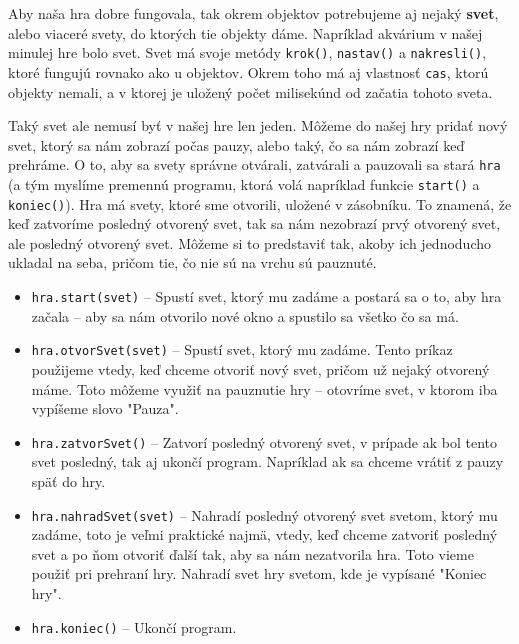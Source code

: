 





Aby naša hra dobre fungovala, tak okrem objektov potrebujeme aj nejaký \textbf{svet}, alebo viaceré
svety, do ktorých tie objekty dáme. Napríklad akvárium v našej minulej hre bolo svet. Svet má svoje
metódy \texttt{krok()}, \texttt{nastav()} a \texttt{nakresli()}, ktoré fungujú rovnako ako u
objektov. Okrem toho má aj vlastnosť \texttt{cas}, ktorú objekty nemali, a v ktorej je uložený počet
milisekúnd od začatia tohoto sveta.

Taký svet ale nemusí byť v našej hre len jeden. Môžeme do našej hry pridať nový svet, ktorý sa
nám zobrazí počas pauzy, alebo taký, čo sa nám zobrazí keď prehráme. O to, aby sa svety správne
otvárali, zatvárali a pauzovali sa stará \texttt{hra} (a tým myslíme premennú programu, ktorá volá
napríklad funkcie \texttt{start()} a \texttt{koniec()}). Hra má svety, ktoré sme otvorili, uložené v
zásobníku. To znamená, že keď zatvoríme posledný otvorený svet, tak sa nám nezobrazí prvý otvorený
svet, ale posledný otvorený svet. Môžeme si to predstaviť tak, akoby ich jednoducho ukladal na seba,
pričom tie, čo nie sú na vrchu sú pauznuté.

\begin{itemize}
	\item \texttt{hra.start(svet)} -- Spustí svet, ktorý mu zadáme a postará sa o to, aby hra
        začala -- aby sa nám otvorilo nové okno a spustilo sa všetko čo sa má.
	
	\item \texttt{hra.otvorSvet(svet)} -- Spustí svet, ktorý mu zadáme. Tento príkaz použijeme
        vtedy, keď chceme otvoriť nový svet, pričom už nejaký otvorený máme. Toto môžeme využiť na
        pauznutie hry -- otovríme svet, v ktorom iba vypíšeme slovo "Pauza".
	
	\item \texttt{hra.zatvorSvet()} -- Zatvorí posledný otvorený svet, v prípade ak bol tento
        svet posledný, tak aj ukončí program. Napríklad ak sa chceme vrátiť z pauzy späť do hry.
	
	\item \texttt{hra.nahradSvet(svet)} -- Nahradí posledný otvorený svet svetom, ktorý mu
        zadáme, toto je veľmi praktické najmä, vtedy, keď chceme zatvoriť posledný svet a po ňom
        otvoriť ďalší tak, aby sa nám nezatvorila hra. Toto vieme použiť pri prehraní hry. Nahradí
        svet hry svetom, kde je vypísané "Koniec hry".
	
	\item \texttt{hra.koniec()} -- Ukončí program.
	
\end{itemize}

